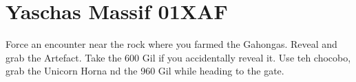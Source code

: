\chapter{Yaschas Massif 01XAF}

Force an encounter near the rock where you farmed the Gahongas. Reveal and grab the Artefact. Take the 600 Gil if you accidentally reveal it. Use teh chocobo, grab the Unicorn Horna nd the 960 Gil while heading to the gate.

